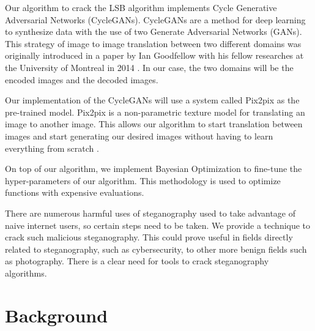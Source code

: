 \documentclass[conference]{IEEEtran}
\begin{document}
Our algorithm to crack the LSB algorithm implements Cycle Generative Adversarial Networks (CycleGANs). CycleGANs are a method for deep learning to synthesize data with the use of two Generate Adversarial Networks (GANs). This strategy of image to image translation between two different domains was originally introduced in a paper by Ian Goodfellow with his fellow researches at the University of Montreal in 2014 \cite{welander_generative_2018}. In our case, the two domains will be the encoded images and the decoded images.

Our implementation of the CycleGANs will use a system called Pix2pix as the pre-trained model. Pix2pix is a non-parametric texture model for translating an image to another image. This allows our algorithm to start translation between images and start generating our desired images without having to learn everything from scratch \cite{meng_steganography_2019}.

On top of our algorithm, we implement Bayesian Optimization to fine-tune the hyper-parameters of our algorithm. This methodology is used to optimize functions with expensive evaluations.

There are numerous harmful uses of steganography used to take advantage of naive internet users, so certain steps need to be taken. We provide a technique to crack such malicious steganography. This could prove useful in fields directly related to steganography, such as cybersecurity, to other more benign fields such as photography. There is a clear need for tools to crack steganography algorithms. 

\section{Background}
\end{document}
